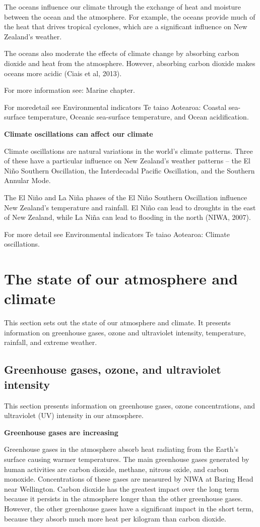 \documentclass[11pt]{mfe-nzers} %
\begin{document}
The oceans influence our climate through the exchange of heat and moisture between the ocean and the atmosphere. For example, the oceans provide much of the heat that drives tropical cyclones, which are a significant influence on New Zealand’s weather.

The oceans also moderate the effects of climate change by absorbing carbon dioxide and heat from the atmosphere. However, absorbing carbon dioxide makes oceans more acidic (Ciais et al, 2013).

For more information see: Marine chapter.

For moredetail see Environmental indicators Te taiao Aotearoa: Coastal sea-surface temperature, Oceanic sea-surface temperature, and Ocean acidification.

\textbf{Climate oscillations can affect our climate}

Climate oscillations are natural variations in the world’s climate patterns. Three of these have a particular influence on New Zealand’s weather patterns – the El Niño Southern Oscillation, the Interdecadal Pacific Oscillation, and the Southern Annular Mode.

The El Niño and La Niña phases of the El Niño Southern Oscillation influence New Zealand’s temperature and rainfall. El Niño can lead to droughts in the east of New Zealand, while La Niña can lead to flooding in the north (NIWA, 2007).

For more detail see Environmental indicators Te taiao Aotearoa: Climate oscillations.

\section{The state of our atmosphere and climate}

This section sets out the state of our atmosphere and climate. It presents information on greenhouse gases, ozone and ultraviolet intensity, temperature, rainfall, and extreme weather.

\subsection{Greenhouse gases, ozone, and ultraviolet intensity}

This section presents information on greenhouse gases, ozone concentrations, and ultraviolet (UV) intensity in our atmosphere.

\textbf{Greenhouse gases are increasing}

Greenhouse gases in the atmosphere absorb heat radiating from the Earth’s surface causing warmer temperatures. The main greenhouse gases generated by human activities are carbon dioxide, methane, nitrous oxide, and carbon monoxide. Concentrations of these gases are measured by NIWA at Baring Head near Wellington. Carbon dioxide has the greatest impact over the long term because it persists in the atmosphere longer than the other greenhouse gases. However, the other greenhouse gases have a significant impact in the short term, because they absorb much more heat per kilogram than carbon dioxide.
\end{document}
